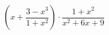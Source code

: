 \begin{ex}[type=expression]
	\begin{condition}
		\(\left( x+\dfrac{3-x^3}{1+x^2} \right)\cdot\dfrac{1+x^2}{x^2+6x+9}\)
	\end{condition}
\end{ex}